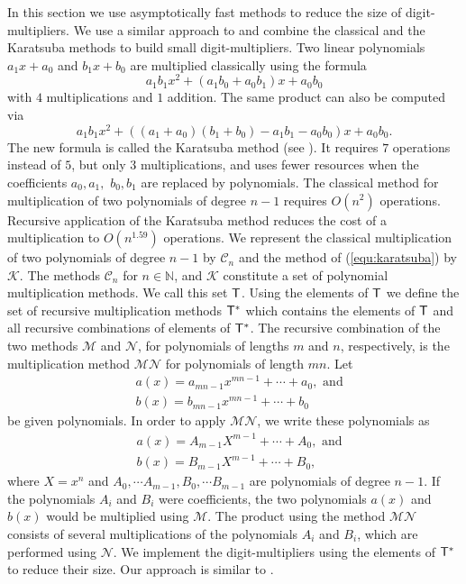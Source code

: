 \documentclass{article}
\begin{document}
In this section we use asymptotically fast methods to reduce the size of digit-multipliers. 
We use a similar approach to \cite{gatsho06} and combine the classical
and the Karatsuba methods to build small digit-multipliers.
Two linear polynomials $a_1x+a_0$ and $b_1x+b_0$ are multiplied
classically using the formula
\begin{equation}
a_1b_1x^2+(a_1b_0+a_0b_1)x+a_0b_0
\label{equ:classical}
\end{equation}
with $4$ multiplications and $1$ addition. 
The same product can also be computed via
\begin{equation}
a_1b_1x^2+((a_1+a_0)(b_1+b_0)-a_1b_1-a_0b_0)x+a_0b_0.
\label{equ:karatsuba}
\end{equation}
The new formula is called the Karatsuba method (see
\cite{karofm63}). It requires $7$ operations instead of $5$, but only
$3$ multiplications, and uses fewer resources when the coefficients
$a_0,a_1,$ $b_0,b_1$ are replaced by polynomials. 
The classical method for multiplication of two polynomials of degree
$n-1$ requires $O(n^2)$ operations. Recursive application of
the Karatsuba method reduces the cost of a multiplication to
$O(n^{1.59})$ operations.
We represent the classical multiplication of two polynomials of degree
$n-1$ by $\mathcal{C}_n$ and the method of (\ref{equ:karatsuba}) by
$\mathcal{K}$.
The methods $\mathcal{C}_n$ for $n \in \mathbb{N}$, and $\mathcal{K}$
constitute a set of polynomial multiplication methods. We call this set
$\sf{T}$. Using the elements of $\sf{T}$ we define the set of
recursive multiplication methods $\sf{T}^{*}$ which contains the
elements of $\sf{T}$ and all recursive combinations of elements of
$\sf{T}^{*}$. The recursive combination of the two methods
$\mathcal{M}$ and $\mathcal{N}$, for polynomials of lengths $m$ and
$n$, respectively, is the multiplication method
$\mathcal{M}\mathcal{N}$ for polynomials of length $mn$. Let
\begin{align*}
& a(x) = a_{mn-1}x^{mn-1}+\cdots+a_0, \text{ and}\\
 & b(x) = b_{mn-1}x^{mn-1}+\cdots+b_0
\end{align*}
be given polynomials. In order to apply $\mathcal{M}\mathcal{N}$, we
write these polynomials as 
\begin{align*}
& a(x) = A_{m-1}X^{m-1}+\cdots+A_{0}, \text{ and}\\
 & b(x) = B_{m-1}X^{m-1}+\cdots+B_{0},
\end{align*}
where $X=x^n$ and $A_0, \cdots A_{m-1}, B_0, \cdots B_{m-1}$ are
polynomials of degree $n-1$.
If the polynomials $A_i$ and $B_i$ were coefficients,
the two polynomials $a(x)$ and $b(x)$ would be multiplied using
$\mathcal{M}$. The product using the method $\mathcal{M}\mathcal{N}$
consists of several multiplications of the polynomials $A_i$ and
$B_i$, which are performed using $\mathcal{N}$.
We implement the digit-multipliers using the elements of $\sf{T}^{*}$
to reduce their size. Our approach is similar to \cite{gatsho06}.
\end{document}
